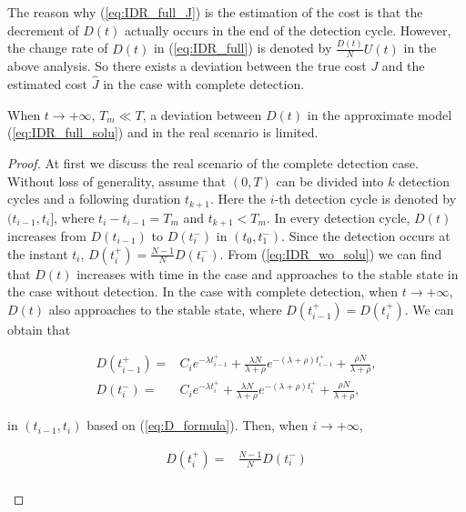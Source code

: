 The reason why (\ref{eq:IDR_full_J}) is the estimation of the cost
is that the decrement of $D(t)$ actually occurs in the end of the detection cycle.
However, the change rate of $D(t)$ in (\ref{eq:IDR_full})
is denoted by $\frac{D(t)}{N}U(t)$ in the above analysis.
So there exists a deviation between the true cost $J$ and the estimated cost $\hat{J}$
in the case with complete detection.
\begin{lem}
When $t \rightarrow +\infty$, $T_{m} \ll T$,
a deviation between $D(t)$ in the approximate model (\ref{eq:IDR_full_solu})
and in the real scenario is limited.
\end{lem}

\begin{proof}
At first we discuss the real scenario of the complete detection case.
Without loss of generality,
assume that $(0, T)$ can be divided into $k$ detection cycles
and a following duration $t_{k+1}$.
Here the $i$-th detection cycle is denoted by $(t_{i-1}, t_{i}]$,
where $t_{i} - t_{i-1} = T_{m}$ and $t_{k+1} < T_{m}$.
In every detection cycle,
$D(t)$ increases from $D(t_{i-1})$ to $D(t_{i}^{-})$
in $(t_{0}, t_{1}^{-})$.
Since the detection occurs at the instant $t_{i}$,
$D(t_{i}^{+}) = \frac{N-1}{N}D(t_{i}^{-})$.
From (\ref{eq:IDR_wo_solu}) we can find that $D(t)$ increases with time in the case
and approaches to the stable state in the case without detection.
In the case with complete detection,
when $t \rightarrow +\infty$,
$D(t)$ also approaches to the stable state,
where $D(t_{i-1}^{+}) = D(t_{i}^{+})$.
We can obtain that
\begin{small}
\begin{equation}
\nonumber
\begin{aligned}
D(t_{i-1}^{+}) = & C_{i} e^{-\lambda t_{i-1}^{+}}
+ \frac{\lambda N}{\lambda + \rho} e^{-(\lambda+\rho)t_{i-1}^{+}}
+ \frac{\rho N}{\lambda+\rho}, \\
D(t_{i}^{-}) = & C_{i} e^{-\lambda t_{i}^{+}}
+ \frac{\lambda N}{\lambda + \rho} e^{-(\lambda+\rho)t_{i}^{+}}
+ \frac{\rho N}{\lambda+\rho},
\end{aligned}
\end{equation}
\end{small}
in $(t_{i-1}, t_{i})$ based on (\ref{eq:D_formula}).
Then, when $i \rightarrow +\infty$,
\begin{small}
\begin{equation}
\nonumber
\begin{aligned}
D(t_{i}^{+}) =& \frac{N-1}{N} D(t_{i}^{-}) \\

\end{aligned}
\end{equation}
\end{small}
\end{proof}
